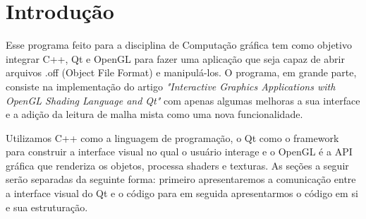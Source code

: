 \section{Introdução}

Esse programa feito para a disciplina de Computação gráfica tem como objetivo integrar
C++, Qt e OpenGL para fazer uma aplicação que seja capaz de abrir arquivos .off (Object File Format)
e manipulá-los. O programa, em grande parte, consiste na implementação do artigo 
\emph{"Interactive Graphics Applications with OpenGL Shading Language and Qt"} com apenas algumas 
melhoras a sua interface e a adição da leitura de malha mista como uma nova funcionalidade.

Utilizamos C++ como a linguagem de programação, o Qt como o framework para 
construir a interface visual no qual o usuário interage e o OpenGL é a API gráfica que renderiza
os objetos, processa shaders e texturas. As seções a seguir serão separadas da seguinte forma: primeiro
apresentaremos a comunicação entre a interface visual do Qt e o código para em seguida apresentarmos o código 
em si e sua estruturação.